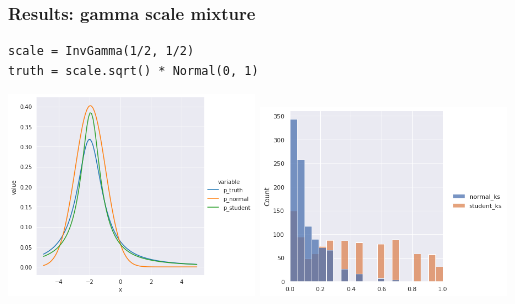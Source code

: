 \documentclass{beamer}
\begin{document}
\begin{frame}[fragile]
    \frametitle{Results: gamma scale mixture}

    \begin{lstlisting}
scale = InvGamma(1/2, 1/2)
truth = scale.sqrt() * Normal(0, 1)
    \end{lstlisting}

    \begin{center}
        \includegraphics[width=0.49\textwidth]{../Figures/cauchy_normal_student.png}
        \includegraphics[width=0.49\textwidth]{../Figures/cauchy_ks.png}
    \end{center}
\end{frame}
\end{document}
